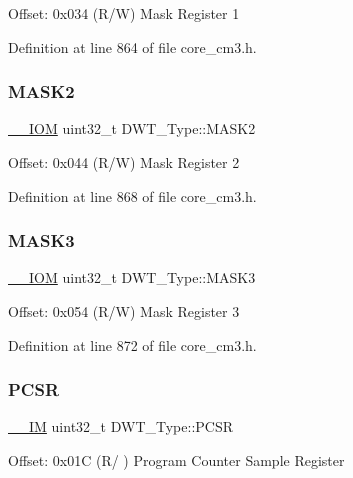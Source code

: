 Offset\+: 0x034 (R/W) Mask Register 1 

Definition at line 864 of file core\+\_\+cm3.\+h.

\mbox{\label{struct_d_w_t___type_a00ac4d830dfe0070a656cda9baed170f}} 
\subsubsection{\texorpdfstring{M\+A\+S\+K2}{MASK2}}
{\footnotesize\ttfamily \hyperlink{core__sc300_8h_ab6caba5853a60a17e8e04499b52bf691}{\+\_\+\+\_\+\+I\+OM} uint32\+\_\+t D\+W\+T\+\_\+\+Type\+::\+M\+A\+S\+K2}

Offset\+: 0x044 (R/W) Mask Register 2 

Definition at line 868 of file core\+\_\+cm3.\+h.

\mbox{\label{struct_d_w_t___type_a2a509d8505c37a3b64f6b24993df5f3f}} 
\subsubsection{\texorpdfstring{M\+A\+S\+K3}{MASK3}}
{\footnotesize\ttfamily \hyperlink{core__sc300_8h_ab6caba5853a60a17e8e04499b52bf691}{\+\_\+\+\_\+\+I\+OM} uint32\+\_\+t D\+W\+T\+\_\+\+Type\+::\+M\+A\+S\+K3}

Offset\+: 0x054 (R/W) Mask Register 3 

Definition at line 872 of file core\+\_\+cm3.\+h.

\mbox{\label{struct_d_w_t___type_a6353ca1d1ad9bc1be05d3b5632960113}} 
\subsubsection{\texorpdfstring{P\+C\+SR}{PCSR}}
{\footnotesize\ttfamily \hyperlink{core__sc300_8h_a4cc1649793116d7c2d8afce7a4ffce43}{\+\_\+\+\_\+\+IM} uint32\+\_\+t D\+W\+T\+\_\+\+Type\+::\+P\+C\+SR}

Offset\+: 0x01C (R/ ) Program Counter Sample Register 

